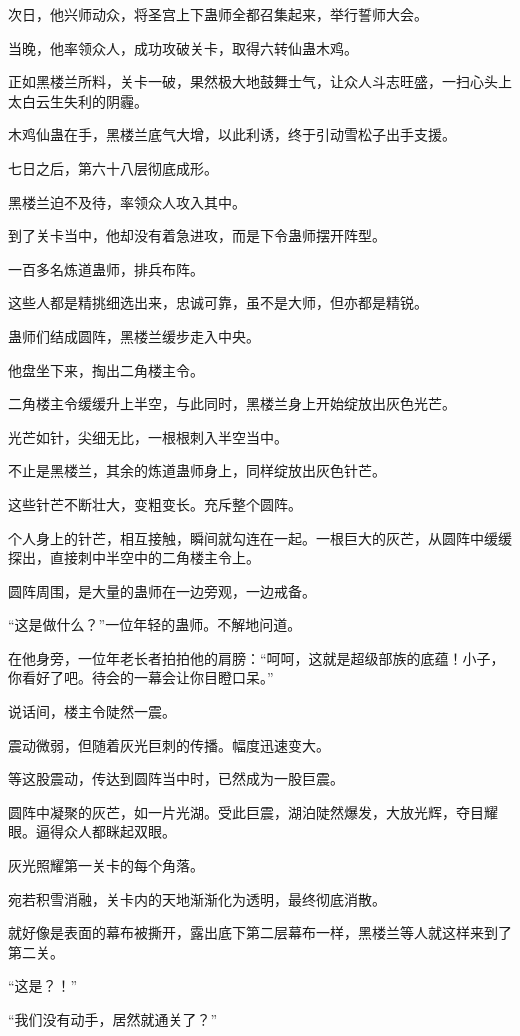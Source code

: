 \begin{this_body}
次日，他兴师动众，将圣宫上下蛊师全都召集起来，举行誓师大会。

当晚，他率领众人，成功攻破关卡，取得六转仙蛊木鸡。

正如黑楼兰所料，关卡一破，果然极大地鼓舞士气，让众人斗志旺盛，一扫心头上太白云生失利的阴霾。

木鸡仙蛊在手，黑楼兰底气大增，以此利诱，终于引动雪松子出手支援。

七日之后，第六十八层彻底成形。

黑楼兰迫不及待，率领众人攻入其中。

到了关卡当中，他却没有着急进攻，而是下令蛊师摆开阵型。

一百多名炼道蛊师，排兵布阵。

这些人都是精挑细选出来，忠诚可靠，虽不是大师，但亦都是精锐。

蛊师们结成圆阵，黑楼兰缓步走入中央。

他盘坐下来，掏出二角楼主令。

二角楼主令缓缓升上半空，与此同时，黑楼兰身上开始绽放出灰色光芒。

光芒如针，尖细无比，一根根刺入半空当中。

不止是黑楼兰，其余的炼道蛊师身上，同样绽放出灰色针芒。

这些针芒不断壮大，变粗变长。充斥整个圆阵。

个人身上的针芒，相互接触，瞬间就勾连在一起。一根巨大的灰芒，从圆阵中缓缓探出，直接刺中半空中的二角楼主令上。

圆阵周围，是大量的蛊师在一边旁观，一边戒备。

“这是做什么？”一位年轻的蛊师。不解地问道。

在他身旁，一位年老长者拍拍他的肩膀：“呵呵，这就是超级部族的底蕴！小子，你看好了吧。待会的一幕会让你目瞪口呆。”

说话间，楼主令陡然一震。

震动微弱，但随着灰光巨刺的传播。幅度迅速变大。

等这股震动，传达到圆阵当中时，已然成为一股巨震。

圆阵中凝聚的灰芒，如一片光湖。受此巨震，湖泊陡然爆发，大放光辉，夺目耀眼。逼得众人都眯起双眼。

灰光照耀第一关卡的每个角落。

宛若积雪消融，关卡内的天地渐渐化为透明，最终彻底消散。

就好像是表面的幕布被撕开，露出底下第二层幕布一样，黑楼兰等人就这样来到了第二关。

“这是？！”

“我们没有动手，居然就通关了？”


\end{this_body}
